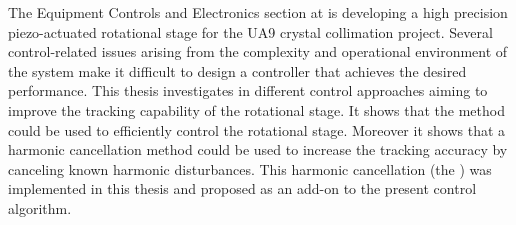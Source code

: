 The Equipment Controls and Electronics section at \abbrCERN is developing a high precision piezo-actuated rotational stage for the UA9 crystal collimation project. Several control-related issues arising from the complexity and operational environment of the system make it difficult to design a controller that achieves the desired performance. This thesis investigates in different control approaches aiming to improve the tracking capability of the rotational stage. It shows that the \abbrIRC method could be used to efficiently control the rotational stage. Moreover it shows that a harmonic cancellation method could be used to increase the tracking accuracy by canceling known harmonic disturbances. This harmonic cancellation (the \abbrRFDC) was implemented in this thesis and proposed as an add-on to the present control algorithm.

